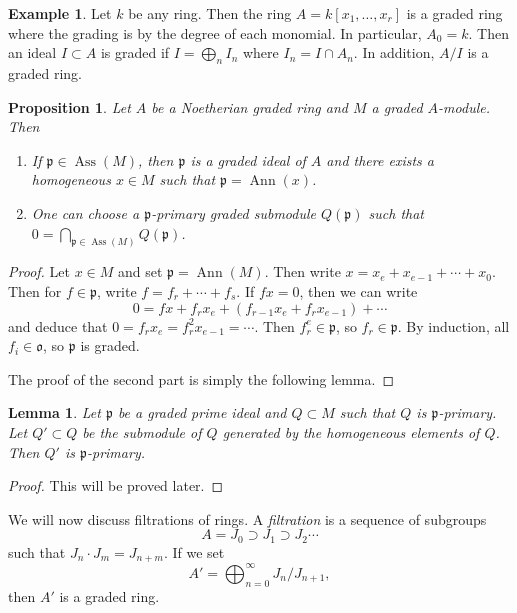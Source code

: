 \documentclass[leqno, openany]{memoir}
\newtheorem{prop}[thm]{Proposition}
\newtheorem{lem}[thm]{Lemma}
\theoremstyle{definition}
\newtheorem{exm}[thm]{Example}
\theoremstyle{remark}
\theoremstyle{plain}
\theoremstyle{definition}
\theoremstyle{remark}
\newcommand{\mf}[1]{\mathfrak{#1}}
\DeclareMathOperator{\Ann}{Ann}
\DeclareMathOperator{\Ass}{Ass}
\begin{document}
\begin{exm} Let $k$ be any ring. Then the ring $A = k[x_1, \ldots, x_r]$ is a
    graded ring where the grading is by the degree of each monomial. In
    particular, $A_0 = k$. Then an ideal $I \subset A$ is graded if $I =
    \bigoplus_n I_n$ where $I_n = I \cap A_n$. In addition, $A/I$ is a graded
    ring.  \end{exm}

\begin{prop} Let $A$ be a Noetherian graded ring and $M$ a graded $A$-module.
    Then \begin{enumerate} \item If $\mf{p} \in \Ass(M)$, then $\mf{p}$ is a
        graded ideal of $A$ and there exists a homogeneous $x \in M$ such that
        $\mf{p} = \Ann(x)$.  \item One can choose a $\mf{p}$-primary graded
submodule $Q(\mf{p})$ such that $0 = \bigcap_{\mf{p} \in \Ass(M)} Q(\mf{p})$.
\end{enumerate} \end{prop}

\begin{proof} Let $x \in M$ and set $\mf{p} = \Ann(M)$. Then write $x = x_e +
    x_{e-1} + \cdots + x_0$. Then for $f \in \mf{p}$, write $f = f_r + \cdots +
    f_s$. If $fx = 0$, then we can write \[ 0 = fx + f_r x_e + (f_{r-1} x_e +
    f_r x_{e-1}) + \cdots \] and deduce that $0 = f_r x_e = f_r^2 x_{e-1} =
    \cdots$. Then $f_r^e \in \mf{p}$, so $f_r \in \mf{p}$. By induction, all
    $f_i \in \mf{o}$, so $\mf{p}$ is graded.

    The proof of the second part is simply the following lemma.  \end{proof}

\begin{lem} Let $\mf{p}$ be a graded prime ideal and $Q \subset M$ such that
$Q$ is $\mf{p}$-primary. Let $Q' \subset Q$ be the submodule of $Q$ generated
by the homogeneous elements of $Q$. Then $Q'$ is $\mf{p}$-primary.  \end{lem}

\begin{proof} This will be proved later.  \end{proof}

We will now discuss filtrations of rings. A \textit{filtration} is a sequence
of subgroups \[ A = J_0 \supset J_1 \supset J_2 \cdots \] such that $J_n \cdot
J_m = J_{n+m}$. If we set \[ A' = \bigoplus_{n=0}^{\infty} J_n / J_{n+1}, \]
then $A'$ is a graded ring.
\end{document}
